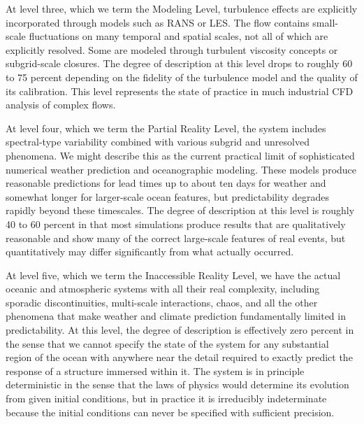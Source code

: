﻿\documentclass[a4paper,11pt]{article}
\theoremstyle{definition}
\begin{document}
At level three, which we term the Modeling Level, turbulence effects are explicitly incorporated through models such as RANS or LES. The flow contains small-scale fluctuations on many temporal and spatial scales, not all of which are explicitly resolved. Some are modeled through turbulent viscosity concepts or subgrid-scale closures. The degree of description at this level drops to roughly 60 to 75 percent depending on the fidelity of the turbulence model and the quality of its calibration. This level represents the state of practice in much industrial CFD analysis of complex flows.

At level four, which we term the Partial Reality Level, the system includes spectral-type variability combined with various subgrid and unresolved phenomena. We might describe this as the current practical limit of sophisticated numerical weather prediction and oceanographic modeling. These models produce reasonable predictions for lead times up to about ten days for weather and somewhat longer for larger-scale ocean features, but predictability degrades rapidly beyond these timescales. The degree of description at this level is roughly 40 to 60 percent in that most simulations produce results that are qualitatively reasonable and show many of the correct large-scale features of real events, but quantitatively may differ significantly from what actually occurred.

At level five, which we term the Inaccessible Reality Level, we have the actual oceanic and atmospheric systems with all their real complexity, including sporadic discontinuities, multi-scale interactions, chaos, and all the other phenomena that make weather and climate prediction fundamentally limited in predictability. At this level, the degree of description is effectively zero percent in the sense that we cannot specify the state of the system for any substantial region of the ocean with anywhere near the detail required to exactly predict the response of a structure immersed within it. The system is in principle deterministic in the sense that the laws of physics would determine its evolution from given initial conditions, but in practice it is irreducibly indeterminate because the initial conditions can never be specified with sufficient precision.
\end{document}
